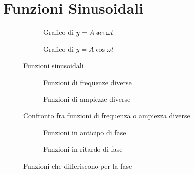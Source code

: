 \chapter{Funzioni Sinusoidali}
\label{sec:FunzioniSinusoidali}
\minitoc
\mtcskip                                %
\minilof                                %
\mtcskip                                %
\minilot
{}
\begin{figure}
	\begin{subfigure}[b]{.5\linewidth}
		\centering
		\caption{Grafico di $y=A\operatorname{sen}\omega t$}\label{fig:asinomegat}
	\end{subfigure}%
	\qquad\qquad
	\begin{subfigure}[b]{.5\linewidth}
		\centering
		\caption{Grafico di $y=A\cos\omega t$}\label{fig:acosomegat}
	\end{subfigure}
	\caption{Funzioni sinusoidali}
	\label{fig:Funzionisinusoidali}
\end{figure}
\begin{figure}
	\begin{subfigure}[b]{.5\linewidth}
		\centering
		\caption{Funzioni di frequenze diverse}\label{fig:frequenzediverse}
	\end{subfigure}%
		\qquad\qquad
	\begin{subfigure}[b]{.5\linewidth}
		\centering
		\caption{Funzioni di ampiezze diverse}\label{fig:ampiezzediverse}
	\end{subfigure}
	\caption{Confronto fra funzioni di frequenza o ampiezza diverse}
	\label{fig:ampiezzediversefrequenzediverse}
\end{figure}
\begin{figure}
	\begin{subfigure}[b]{.5\linewidth}
		\centering
		\caption{Funzioni in anticipo di fase}\label{fig:AsinomegaTSfasamentoAnticipato}
	\end{subfigure}%
		\qquad\qquad
	\begin{subfigure}[b]{.5\linewidth}
		\centering
		\caption{Funzioni in ritardo di fase}\label{fig:AsinomegaTSfasamentoRitardato}
	\end{subfigure}
	\caption{Funzioni che differiscono per la fase}%
	\label{fig:Funzionichedifferisconoperlafase}%
\end{figure}
